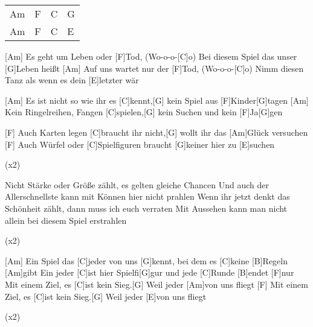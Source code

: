

\begin{guitar}
	{\footnotesize\begin{tabular}{l|l|l|l}
			Am & F & C & G \\
			Am & F & C & E \\
	\end{tabular}}
	
	[Am] Es geht um Leben oder [F]Tod, (Wo-o-o-[C]o)
	Bei diesem Spiel das unser [G]Leben heißt
	[Am] Auf uns wartet nur der [F]Tod, (Wo-o-o-[C]o)
	Nimm diesen Tanz als wenn es dein [E]letzter wär
	
	[Am] Es ist nicht so wie ihr es [C]kennt,[G] kein Spiel aus [F]Kinder[G]tagen
	[Am] Kein Ringelreihen, Fangen [C]spielen,[G] kein Suchen und kein [F]Ja[G]gen
	
	[F] Auch Karten legen [C]braucht ihr nicht,[G] wollt ihr das [Am]Glück versuchen
	[F] Auch Würfel oder [C]Spielfiguren braucht [G]keiner hier zu [E]suchen
	
	  (x2)
	
	Nicht Stärke oder Größe zählt, es gelten gleiche Chancen
	Und auch der Allerschnellste kann mit Können hier nicht prahlen
	Wenn ihr jetzt denkt das Schönheit zählt, dann muss ich euch verraten
	Mit Aussehen kann man nicht allein bei diesem Spiel erstrahlen
	
	  (x2)
	
	[Am] Ein Spiel das [C]jeder von uns [G]kennt, bei dem es [C]keine [B]Regeln [Am]gibt
	Ein jeder [C]ist hier Spielfi[G]gur und jede [C]Runde [B]endet [F]nur
	Mit einem Ziel, es [C]ist kein Sieg.[G] Weil jeder [Am]von uns fliegt
	[F] Mit einem Ziel, es [C]ist kein Sieg.[G] Weil jeder [E]von uns fliegt
	
	  (x2)
	
\end{guitar}